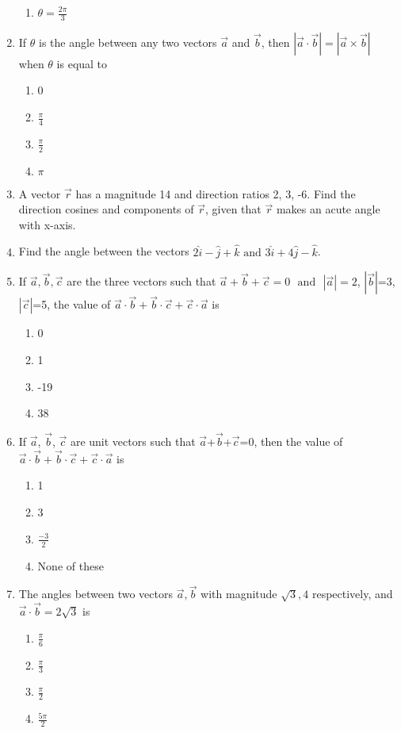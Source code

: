 \begin{enumerate}[label=\thesection.\arabic*,ref=\thesection.\theenumi]
\begin{enumerate}
\item $\theta=\frac{2\pi}{3}$
\end{enumerate}
\item If $\theta$ is the angle between any two vectors $\vec{a}$ and $\vec{b}$, then $|\vec{a} \cdot \vec{b}|=|\vec{a}\times\vec{b}|$ when $\theta$ is equal to
\begin{enumerate}
\item 0
\item $\frac{\pi}{4}$
\item $\frac{\pi}{2}$
\item $\pi$
\end{enumerate}
\item A vector $\vec{r}$ has a magnitude 14 and direction ratios 2, 3, -6. Find the direction cosines and components of $\vec{r}$, given that $\vec{r}$ makes an acute angle with x-axis.
\item Find the angle between the vectors $2\hat{i}-\hat{j}+\hat{k}$ $\text{and}$ $3\hat{i}+4\hat{j}-\hat{k}$.
\item If $\vec{a},\vec{b},\vec{c}$ are the three vectors such that $\vec{a}+\vec{b}+\vec{c}=0$ $\text{ and }$ $|\vec{a}|=2$, $|\vec{b}|$=3, $|\vec{c}|$=5, the value of $\vec{a} \cdot \vec{b}+\vec{b} \cdot \vec{c}+\vec{c} \cdot \vec{a}$ is
	\begin{enumerate}
\item 0
\item 1	
\item -19
\item 38
\end{enumerate}
\item If $\vec{a}$, $\vec{b}$, $\vec{c}$ are unit vectors such that $\vec{a}$+$\vec{b}$+$\vec{c}$=0, then the value of $\vec{a} \cdot \vec{b}+\vec{b} \cdot \vec{c}+\vec{c} \cdot \vec{a}$ is
	\begin{enumerate}
\item 1
\item 3
\item $\frac{-3}{2}$
\item None of these
\end{enumerate}
\item The angles between two vectors $\vec{a}, \vec{b}$ with magnitude $\sqrt{3}, 4$ respectively, and $\vec{a} \cdot \vec{b}= 2\sqrt{3}$ is
	\begin{enumerate}
\item $\frac{\pi}{6}$
\item $\frac{\pi}{3}$
\item $\frac{\pi}{2}$ 
\item $\frac{5\pi}{2}$
\end{enumerate}


\end{enumerate}
